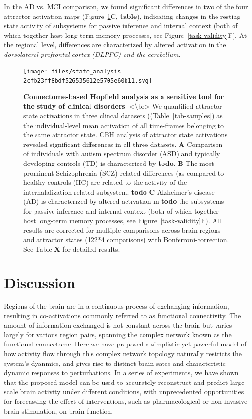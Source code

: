 \documentclass{article}
\begin{document}
In the AD vs. MCI comparison, we found significant differences in two of the four attractor activation maps (Figure~\ref{clinical-validity}C, \textbf{table}), indicating changes in the resting state activity of subsystems for passive inference and internal context (both of which together host long-term memory processes, see Figure~\ref{task-validity}F). At the regional level, differences are characterized by altered activation in the \textit{dorsolateral prefrontal cortex (DLPFC) and the cerebellum}.

\begin{figure}[!htbp]
\centering
\texttt{[image: files/state\_analysis-2cfb23ff8bdf526535612e5705e60b11.svg]}
\caption[]{\textbf{Connectome-based Hopfield analysis as a sensitive tool for the study of clinical disorders.} \newline
\textless {\textbackslash}br\textgreater 
We quantified attractor state activations in three clincal datasets ((Table~\ref{tab-samples}) as the individual-level mean activation of all time-frames belonging to the same attractor state.
CBH analysis of attractor state activations revealed significant differences in all three datasets.
\textbf{A} Comparison of individuals with autism spectrum disorder (ASD) and typically developing controls (TD) is characterized by \textbf{todo}.
\textbf{B} The most prominent Schizophrenia (SCZ)-related differences (as compared to healthy controls (HC) are related to the activity of the internalalization-related subsystem. \textbf{todo}
\textbf{C} Alzheimer's disease (AD) is characterized by altered activation in \textbf{todo} the subsystems for passive inference and internal context (both of which together host long-term memory processes, see Figure~\ref{task-validity}F). All results are corrected for multiple comparisons across brain regions and attractor states (122*4 comparisons) with Bonferroni-correction. See Table \textbf{X} for detailed results.}
\label{clinical-validity}
\end{figure}

\section{Discussion}\label{Discussion}

Regions of the brain are in a continuous process of exchanging information, resulting in co-activations commonly referred to as functional connectivity.
The amount of information exchanged is not constant across the brain but varies largely for various region pairs, spanning the complex network known as the functional connectome.
Here we have proposed a simplistic yet powerful model of how activity flow through this complex network topology naturally restricts the system's dyanmics, and gives rise to distinct brain sates and characteristic dynamic responses to perturbations.
In a series of experiments, we have shown that the proposed model can be used to accurately reconstruct and predict large-scale brain activity under different conditions, with unprecedented opportunities for forecasting the effect of interventions, such as pharmacological or non-invasive brain stimulation, on brain function.
\end{document}

